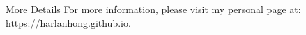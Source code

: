 \documentclass{resume} %
\begin{document}



\begin{rSection}{More Details}
For more information, please visit my personal page at: https://harlanhong.github.io.
\end{rSection}

\end{document}
